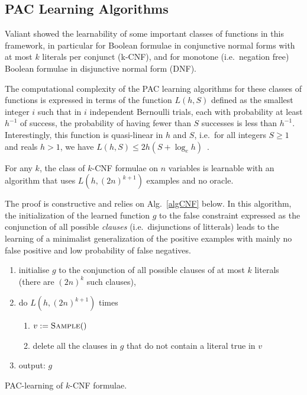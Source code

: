 \documentclass{llncs}
\begin{document}
\subsection{PAC Learning Algorithms}

Valiant showed the learnability of some important classes of functions in this framework,
in particular for Boolean formulae in conjunctive normal forms with at most $k$ literals per conjunct (k-CNF),
and for monotone (i.e.~negation free) Boolean formulae in disjunctive normal form (DNF).

The computational complexity of the PAC learning algorithms for these classes of functions is expressed in terms of the function
$L(h,S)$ defined as the smallest integer $i$ such that
in $i$ independent Bernoulli trials, each with probability at least $h^{-1}$ of success, the probability of having fewer than $S$ successes is less than $h^{-1}$.
Interestingly, this function is quasi-linear in $h$ and $S$, i.e.~for all
integers $S\ge 1$ and reals $h>1$, we have $L(h,S) \le 2h(S+\log_e h)$~\cite{Valiant84cacm}.

\begin{theorem}\label{thm:kcnf}
For any $k$, the class of $k$-CNF formulae on $n$ variables is learnable with an
algorithm that uses $L(h,{(2 n)}^{k+1})$ examples and no oracle.
\end{theorem}

The proof is constructive and relies on Alg.~\ref{algCNF} below. In this algorithm, the initialization of the learned function $g$ to the false constraint expressed as the conjunction of all possible \emph{clauses} (i.e.~disjunctions of litterals)
leads to the learning of a minimalist  generalization of the positive examples with mainly no false positive and low probability of false negatives.

\begin{algorithm}
\begin{enumerate}
  \item initialise $g$ to the conjunction of all possible clauses of at most $k$ literals (there are $(2n)^k$ such clauses),
\item do $L(h,(2n)^{k+1})$ times 
\begin{enumerate}
\item $v:=\textsc{Sample}()$
\item delete all the clauses in $g$ that do not contain a literal true in $v$
\end{enumerate}
\item output: $g$
\end{enumerate}
\caption{PAC-learning of $k$-CNF formulae.\label{algCNF}}
\end{algorithm}
\end{document}
